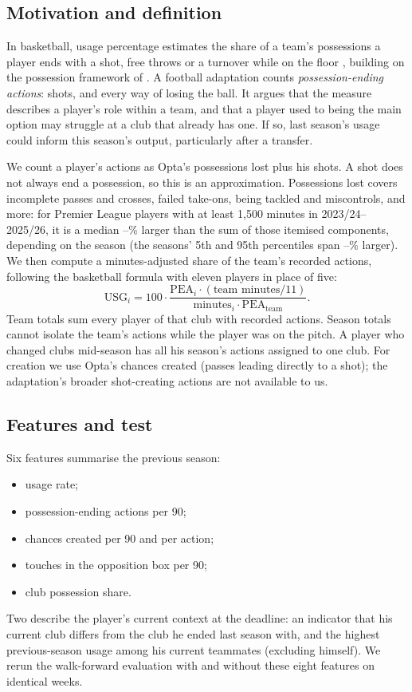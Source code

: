 \documentclass[11pt,a4paper]{article}
\begin{document}
\subsection{Motivation and definition}
In basketball, usage percentage estimates the share of a team's possessions a player ends with a
shot, free throws or a turnover while on the floor \citep{bbrefglossary}, building on the
possession framework of \citet{oliver2004}. A football adaptation
\citep{sincerefc2025a,sincerefc2025b} counts \emph{possession-ending actions}: shots, and every way
of losing the ball. It argues that the measure describes a player's role within a team, and that
a player used to being the main option may struggle at a club that already has one. If so,
last season's usage could inform this season's output, particularly after a transfer.

We count a player's actions as Opta's possessions lost plus his shots. A shot does not always end
a possession, so this is an approximation. Possessions lost covers incomplete passes and crosses,
failed take-ons, being tackled and miscontrols, and more: for Premier League players with at least
1{,}500 minutes in 2023/24--2025/26, it is a median \possMedianLow--\possMedianHigh\% larger than
the sum of those itemised components, depending on the season (the seasons' 5th and 95th
percentiles span \possPLow--\possPHigh\% larger). We
then compute a minutes-adjusted share of the team's recorded actions, following the basketball
formula with eleven players in place of five:
\[
  \mathrm{USG}_i = 100\cdot\frac{\mathrm{PEA}_i\cdot(\text{team minutes}/11)}{\text{minutes}_i\cdot\mathrm{PEA}_{\text{team}}}.
\]
Team totals sum every player of that club with recorded actions. Season totals cannot isolate the
team's actions while the player was on the pitch. A player who changed clubs mid-season has all his
season's actions assigned to one club. For creation we use Opta's chances created (passes leading
directly to a shot); the adaptation's broader shot-creating actions are not available to us.

\subsection{Features and test}
Six features summarise the previous season:
\begin{itemize}
  \item usage rate;
  \item possession-ending actions per 90;
  \item chances created per 90 and per action;
  \item touches in the opposition box per 90;
  \item club possession share.
\end{itemize}
Two describe the player's current context at the deadline: an indicator that his current club
differs from the club he ended last season with, and the highest previous-season usage among his
current teammates (excluding himself). We rerun the walk-forward evaluation with and without these
eight features on identical weeks.
\end{document}
